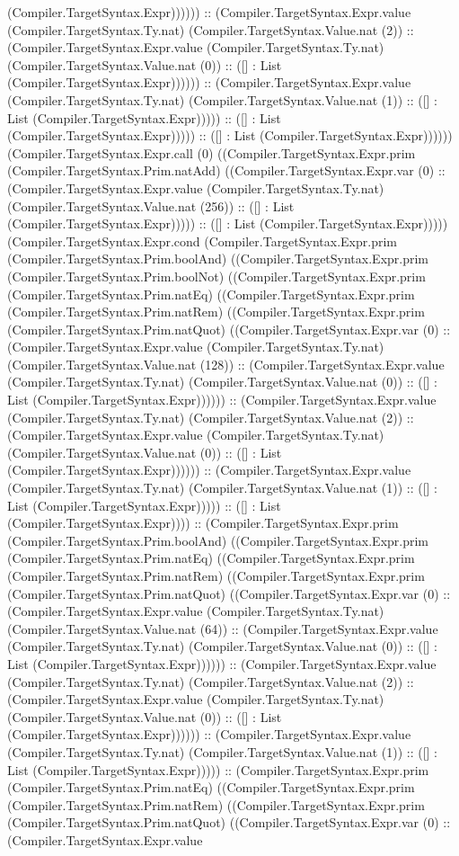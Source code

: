 \documentclass[11pt]{article}
\begin{document}
(Compiler.TargetSyntax.Expr)))))) :: (Compiler.TargetSyntax.Expr.value (Compiler.TargetSyntax.Ty.nat) (Compiler.TargetSyntax.Value.nat (2)) :: (Compiler.TargetSyntax.Expr.value (Compiler.TargetSyntax.Ty.nat) (Compiler.TargetSyntax.Value.nat (0)) :: ([] : List (Compiler.TargetSyntax.Expr)))))) :: (Compiler.TargetSyntax.Expr.value (Compiler.TargetSyntax.Ty.nat) (Compiler.TargetSyntax.Value.nat (1)) :: ([] : List (Compiler.TargetSyntax.Expr))))) :: ([] : List (Compiler.TargetSyntax.Expr))))) :: ([] : List (Compiler.TargetSyntax.Expr)))))) (Compiler.TargetSyntax.Expr.call (0) ((Compiler.TargetSyntax.Expr.prim (Compiler.TargetSyntax.Prim.natAdd) ((Compiler.TargetSyntax.Expr.var (0) :: (Compiler.TargetSyntax.Expr.value (Compiler.TargetSyntax.Ty.nat) (Compiler.TargetSyntax.Value.nat (256)) :: ([] : List (Compiler.TargetSyntax.Expr))))) :: ([] : List (Compiler.TargetSyntax.Expr))))) (Compiler.TargetSyntax.Expr.cond (Compiler.TargetSyntax.Expr.prim (Compiler.TargetSyntax.Prim.boolAnd) ((Compiler.TargetSyntax.Expr.prim (Compiler.TargetSyntax.Prim.boolNot) ((Compiler.TargetSyntax.Expr.prim (Compiler.TargetSyntax.Prim.natEq) ((Compiler.TargetSyntax.Expr.prim (Compiler.TargetSyntax.Prim.natRem) ((Compiler.TargetSyntax.Expr.prim (Compiler.TargetSyntax.Prim.natQuot) ((Compiler.TargetSyntax.Expr.var (0) :: (Compiler.TargetSyntax.Expr.value (Compiler.TargetSyntax.Ty.nat) (Compiler.TargetSyntax.Value.nat (128)) :: (Compiler.TargetSyntax.Expr.value (Compiler.TargetSyntax.Ty.nat) (Compiler.TargetSyntax.Value.nat (0)) :: ([] : List (Compiler.TargetSyntax.Expr)))))) :: (Compiler.TargetSyntax.Expr.value (Compiler.TargetSyntax.Ty.nat) (Compiler.TargetSyntax.Value.nat (2)) :: (Compiler.TargetSyntax.Expr.value (Compiler.TargetSyntax.Ty.nat) (Compiler.TargetSyntax.Value.nat (0)) :: ([] : List (Compiler.TargetSyntax.Expr)))))) :: (Compiler.TargetSyntax.Expr.value (Compiler.TargetSyntax.Ty.nat) (Compiler.TargetSyntax.Value.nat (1)) :: ([] : List (Compiler.TargetSyntax.Expr))))) :: ([] : List (Compiler.TargetSyntax.Expr)))) :: (Compiler.TargetSyntax.Expr.prim (Compiler.TargetSyntax.Prim.boolAnd) ((Compiler.TargetSyntax.Expr.prim (Compiler.TargetSyntax.Prim.natEq) ((Compiler.TargetSyntax.Expr.prim (Compiler.TargetSyntax.Prim.natRem) ((Compiler.TargetSyntax.Expr.prim (Compiler.TargetSyntax.Prim.natQuot) ((Compiler.TargetSyntax.Expr.var (0) :: (Compiler.TargetSyntax.Expr.value (Compiler.TargetSyntax.Ty.nat) (Compiler.TargetSyntax.Value.nat (64)) :: (Compiler.TargetSyntax.Expr.value (Compiler.TargetSyntax.Ty.nat) (Compiler.TargetSyntax.Value.nat (0)) :: ([] : List (Compiler.TargetSyntax.Expr)))))) :: (Compiler.TargetSyntax.Expr.value (Compiler.TargetSyntax.Ty.nat) (Compiler.TargetSyntax.Value.nat (2)) :: (Compiler.TargetSyntax.Expr.value (Compiler.TargetSyntax.Ty.nat) (Compiler.TargetSyntax.Value.nat (0)) :: ([] : List (Compiler.TargetSyntax.Expr)))))) :: (Compiler.TargetSyntax.Expr.value (Compiler.TargetSyntax.Ty.nat) (Compiler.TargetSyntax.Value.nat (1)) :: ([] : List (Compiler.TargetSyntax.Expr))))) :: (Compiler.TargetSyntax.Expr.prim (Compiler.TargetSyntax.Prim.natEq) ((Compiler.TargetSyntax.Expr.prim (Compiler.TargetSyntax.Prim.natRem) ((Compiler.TargetSyntax.Expr.prim (Compiler.TargetSyntax.Prim.natQuot) ((Compiler.TargetSyntax.Expr.var (0) :: (Compiler.TargetSyntax.Expr.value 
\end{document}
